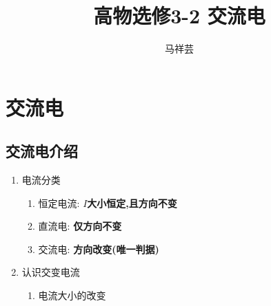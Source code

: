\documentclass{article}
\title{高物选修3-2 \quad 交流电}
\author{马祥芸}
\begin{document}
\maketitle
\tableofcontents
\newpage

\section{交流电}

\subsection{交流电介绍}

\begin{enumerate}
    \item 电流分类
          \begin{enumerate}[label=(\arabic*)]
              \item 恒定电流: \quad \textbf{$I$大小恒定,且方向不变}
              \item 直流电: \quad \textbf{仅方向不变}
              \item 交流电: \quad \textbf{方向改变(唯一判据)}
          \end{enumerate}

    \item 认识交变电流
          \begin{enumerate}[label=(\arabic*)]
              \item 电流大小的改变
                    \begin{figure}[h] %
                        \centering


\end{figure}
\end{enumerate}
\end{enumerate}
\end{document}
